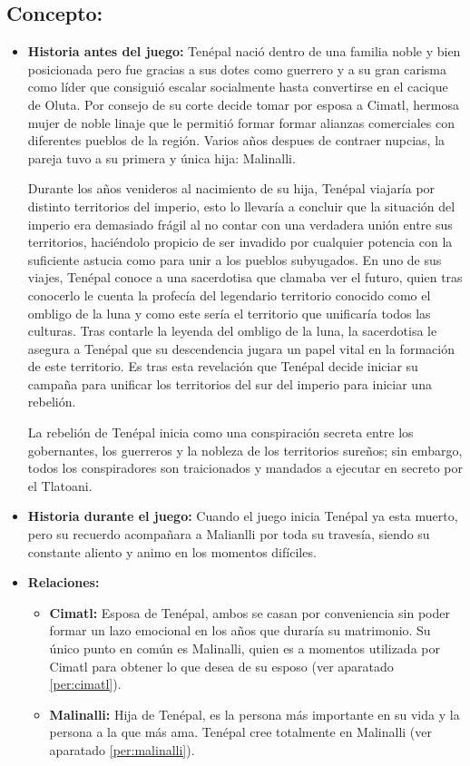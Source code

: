 \subsection{Concepto:}
\begin{itemize}
	\item \textbf{Historia antes del juego:}
	Tenépal nació dentro de una familia noble y bien posicionada pero fue gracias a sus dotes como guerrero y a su gran carisma como líder que consiguió escalar socialmente hasta convertirse en el cacique de Oluta. Por consejo de su corte decide tomar por esposa a Cimatl, hermosa mujer de noble linaje que le permitió formar formar alianzas comerciales con diferentes pueblos de la región. Varios años despues de contraer nupcias, la pareja tuvo a su primera y única hija: Malinalli. 
	\\
	\par
	Durante los años venideros al nacimiento de su hija, Tenépal viajaría por distinto territorios del imperio, esto lo llevaría a concluir que la situación del imperio era demasiado frágil al no contar con una verdadera unión entre sus territorios, haciéndolo propicio de ser invadido por cualquier potencia con la suficiente astucia como para unir a los pueblos subyugados. En uno de sus viajes, Tenépal conoce a una sacerdotisa que clamaba ver el futuro, quien tras conocerlo le cuenta la profecía del legendario territorio conocido como el ombligo de la luna y como este sería el territorio que unificaría todos las culturas. Tras contarle la leyenda del ombligo de la luna, la sacerdotisa le asegura a Tenépal que su descendencia jugara un papel vital en la formación de este territorio. Es tras esta revelación que Tenépal decide iniciar su campaña para unificar los territorios del sur del imperio para iniciar una rebelión.
	\\
	\par
	La rebelión de Tenépal inicia como una conspiración secreta entre los gobernantes, los guerreros y la nobleza de los territorios sureños; sin embargo, todos los conspiradores son traicionados y mandados a ejecutar en secreto por el Tlatoani.  
	\item \textbf{Historia durante el juego:}
	Cuando el juego inicia Tenépal ya esta muerto, pero su recuerdo acompañara a Malianlli por toda su travesía, siendo su constante aliento y animo en los momentos difíciles.
	\item \textbf{Relaciones:}
	\begin{itemize}
		\item \textbf{Cimatl:} Esposa de Tenépal, ambos se casan por conveniencia sin poder formar un lazo emocional en los años que duraría su matrimonio. Su único punto en común es Malinalli, quien es a momentos utilizada por Cimatl para obtener lo que desea de su esposo (ver aparatado \ref{per:cimatl}).
		\item \textbf{Malinalli:} Hija de Tenépal, es la persona más importante en su vida y la persona a la que más ama. Tenépal cree totalmente en Malinalli (ver aparatado \ref{per:malinalli}). 
	\end{itemize}                     
\end{itemize}


